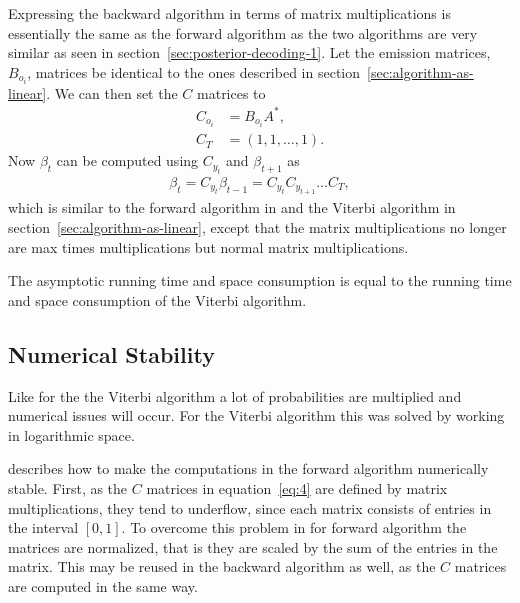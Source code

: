 Expressing the backward algorithm in terms of matrix multiplications is
essentially the same as the forward algorithm as the two algorithms are very
similar as seen in section~\ref{sec:posterior-decoding-1}. Let the emission
matrices, $B_{o_i}$, matrices be identical to the ones described in
section~\ref{sec:algorithm-as-linear}. We can then set the $C$ matrices to
\begin{equation}
  \label{eq:4}
  \begin{aligned}
    C_{o_i} & = B_{o_i} A^*, \\
    C_T & = (1, 1, \dots, 1).
  \end{aligned}
\end{equation}
Now $\beta_t$ can be computed using $C_{y_t}$ and $\beta_{t + 1}$ as
\begin{equation}
  \label{eq:5}
  \begin{aligned}
    \beta_t = C_{y_t} \beta_{t - 1} = C_{y_t} C_{y_{t+1}}\dots C_T,
  \end{aligned}
\end{equation}
which is similar to the forward algorithm in \citet{sand2013ziphmmlib} and the
Viterbi algorithm in section~\ref{sec:algorithm-as-linear}, except that the
matrix multiplications no longer are max times multiplications but normal
matrix multiplications.

The asymptotic running time and space consumption is equal to the running time
and space consumption of the Viterbi algorithm.


\subsection{Numerical Stability}

Like for the the Viterbi algorithm a lot of probabilities are multiplied and
numerical issues will occur. For the Viterbi algorithm this was solved by
working in logarithmic space.

\citet{sand2013ziphmmlib} describes how to make the computations in the forward
algorithm numerically stable. First, as the $C$ matrices in
equation~\eqref{eq:4} are defined by matrix multiplications, they tend to
underflow, since each matrix consists of entries in the interval $[0, 1]$. To
overcome this problem in for forward algorithm the matrices are normalized,
that is they are scaled by the sum of the entries in the matrix. This may be
reused in the backward algorithm as well, as the $C$ matrices are computed in
the same way.

